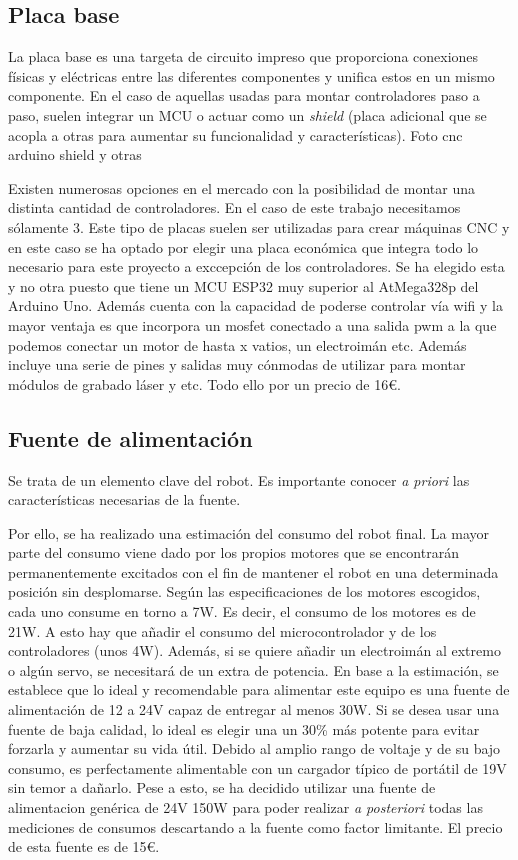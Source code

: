 \subsection{Placa base}
La placa base es una targeta de circuito impreso que proporciona conexiones físicas y eléctricas entre las diferentes componentes y 
unifica estos en un mismo componente. 
En el caso de aquellas usadas para montar controladores paso a paso, suelen integrar un \ac{MCU} o actuar como un \textit{shield} 
(placa adicional que se acopla a otras para aumentar su funcionalidad y características).
Foto cnc arduino shield y otras

Existen numerosas opciones en el mercado con la posibilidad de montar una distinta cantidad de controladores. En el caso de este 
trabajo necesitamos sólamente 3. Este tipo de placas suelen ser utilizadas para crear máquinas CNC y en este caso se ha optado por 
elegir una placa económica que integra todo lo necesario para este proyecto a exccepción de los controladores. 
Se ha elegido esta y no otra puesto que tiene un \acs{MCU} ESP32 muy superior al AtMega328p del Arduino Uno. Además cuenta con la 
capacidad de poderse controlar vía wifi y la mayor ventaja es que incorpora un mosfet conectado a una salida pwm a la que podemos conectar 
un motor de hasta x vatios, un electroimán etc. Además incluye una serie de pines y salidas muy cónmodas de utilizar para montar 
módulos de grabado láser y etc. Todo ello por un precio de 16€.

\subsection{Fuente de alimentación}
Se trata de un elemento clave del robot. Es importante conocer \textit{a priori} las 
características necesarias de la fuente.

Por ello, se ha realizado una estimación del consumo del robot final. La mayor parte del consumo viene dado por los propios motores que 
se encontrarán permanentemente excitados con el fin de mantener el robot en una determinada posición sin desplomarse. Según las especificaciones 
de los motores escogidos, cada uno consume en torno a 7W. Es decir, el consumo de los motores es de 21W. A esto hay que añadir el consumo del 
microcontrolador y de los controladores (unos 4W). Además, si se quiere añadir un electroimán al extremo o algún servo, se necesitará de 
un extra de potencia. 
En base  a la estimación, se establece que lo ideal y recomendable para alimentar este equipo es una fuente de alimentación de 12 a 24V capaz 
de entregar al menos 30W. Si se desea usar una fuente de baja calidad, lo ideal es elegir una un 30\% más potente para evitar forzarla y aumentar 
su vida útil.
Debido al amplio rango de voltaje y de su bajo consumo, es perfectamente alimentable con un cargador típico de portátil de 19V sin temor 
a dañarlo. Pese a esto, se ha decidido utilizar una fuente de alimentacion genérica de 24V 150W para poder realizar \textit{a posteriori} 
todas las mediciones de consumos descartando a la fuente como factor limitante. El precio de esta fuente es de 15\euro.

